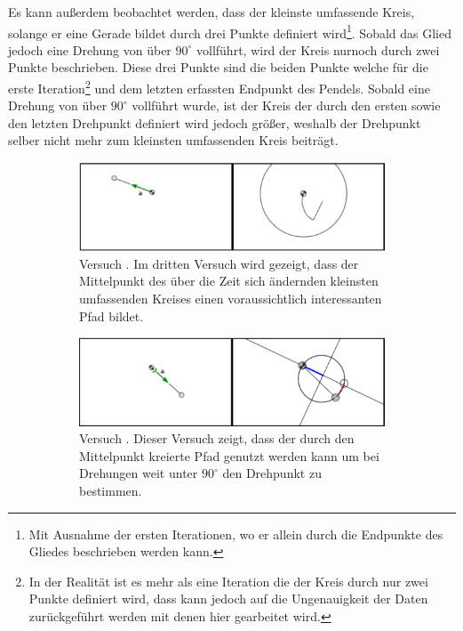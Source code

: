 Es kann au{\ss}erdem beobachtet werden, dass der kleinste umfassende Kreis, solange er eine Gerade bildet durch drei Punkte definiert wird\footnote{Mit Ausnahme der ersten Iterationen, wo er allein durch die Endpunkte des Gliedes beschrieben werden kann.}.
Sobald das Glied jedoch eine Drehung von über $90^\circ$ vollführt, wird der Kreis nurnoch durch zwei Punkte beschrieben.
Diese drei Punkte sind die beiden Punkte welche für die erste Iteration\footnote{In der Realität ist es mehr als eine Iteration die der Kreis durch nur zwei Punkte definiert wird, dass kann jedoch auf die Ungenauigkeit der Daten zurückgeführt werden mit denen hier gearbeitet wird.} und dem letzten erfassten Endpunkt des Pendels.
Sobald eine Drehung von über $90^\circ$ vollführt wurde, ist der Kreis der durch den ersten sowie den letzten Drehpunkt definiert wird jedoch grö{\ss}er, weshalb der Drehpunkt selber nicht mehr zum kleinsten umfassenden Kreis beiträgt.


\begin{figure}
    \centering
    \begin{subfigure}[t]{0.45\textwidth}
        \includegraphics[width=\textwidth]{gfx/pendel1_3.png}
        \caption{Versuch . Im dritten Versuch wird gezeigt, dass der Mittelpunkt des über die Zeit sich ändernden kleinsten umfassenden Kreises einen voraussichtlich interessanten Pfad bildet.}\label{fig:pendel1_3}
    \end{subfigure}
    \begin{subfigure}[t]{0.45\textwidth}
        \includegraphics[width=\textwidth]{gfx/pendel1_4.png}
        \caption{Versuch . Dieser Versuch zeigt, dass der durch den Mittelpunkt kreierte Pfad genutzt werden kann um bei Drehungen weit unter $90^\circ$ den Drehpunkt zu bestimmen.}\label{fig:pendel1_4}
    \end{subfigure}
    \caption[Versuche  und ]{}
    \label{fig:pendel1_3_4}
\end{figure}

